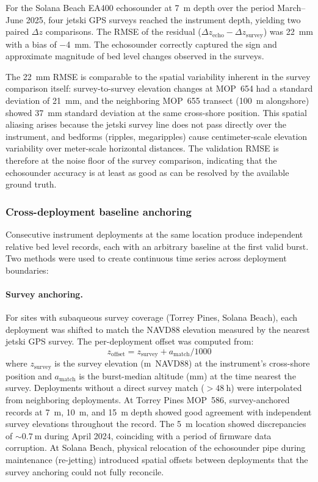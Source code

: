 For the Solana Beach EA400 echosounder at \SI{7}{\meter} depth over
the period March--June 2025, four jetski GPS surveys reached the
instrument depth, yielding two paired $\Delta z$ comparisons. The
RMSE of the residual ($\Delta z_\text{echo} - \Delta z_\text{survey}$)
was \SI{22}{\milli\meter} with a bias of \SI{-4}{\milli\meter}. The
echosounder correctly captured the sign and approximate magnitude
of bed level changes observed in the surveys.

The \SI{22}{\milli\meter} RMSE is comparable to the spatial variability
inherent in the survey comparison itself: survey-to-survey elevation
changes at MOP~654 had a standard deviation of \SI{21}{\milli\meter},
and the neighboring MOP~655 transect (\SI{100}{\meter} alongshore)
showed \SI{37}{\milli\meter} standard deviation at the same
cross-shore position. This spatial aliasing arises because the jetski
survey line does not pass directly over the instrument, and bedforms
(ripples, megaripples) cause centimeter-scale elevation variability
over meter-scale horizontal distances. The validation RMSE is therefore
at the noise floor of the survey comparison, indicating that the
echosounder accuracy is at least as good as can be resolved by the
available ground truth.

\subsubsection{Cross-deployment baseline anchoring}

Consecutive instrument deployments at the same location produce
independent relative bed level records, each with an arbitrary
baseline at the first valid burst. Two methods were used to create
continuous time series across deployment boundaries:

\paragraph{Survey anchoring.} For sites with subaqueous survey
coverage (Torrey Pines, Solana Beach), each deployment was shifted
to match the NAVD88 elevation measured by the nearest jetski GPS
survey. The per-deployment offset was computed from:
%
\begin{equation}
  z_\text{offset} = z_\text{survey} + a_\text{match} / 1000
\end{equation}
%
where $z_\text{survey}$ is the survey elevation (m~NAVD88) at the
instrument's cross-shore position and $a_\text{match}$ is the
burst-median altitude (mm) at the time nearest the survey.
Deployments without a direct survey match ($> \SI{48}{\hour}$) were
interpolated from neighboring deployments. At Torrey Pines MOP~586,
survey-anchored records at \SI{7}{\meter}, \SI{10}{\meter}, and
\SI{15}{\meter} depth showed good agreement with independent survey
elevations throughout the record. The \SI{5}{\meter} location showed
discrepancies of $\sim \SI{0.7}{\meter}$ during April 2024, coinciding
with a period of firmware data corruption. At Solana Beach, physical
relocation of the echosounder pipe during maintenance (re-jetting)
introduced spatial offsets between deployments that the survey
anchoring could not fully reconcile.

